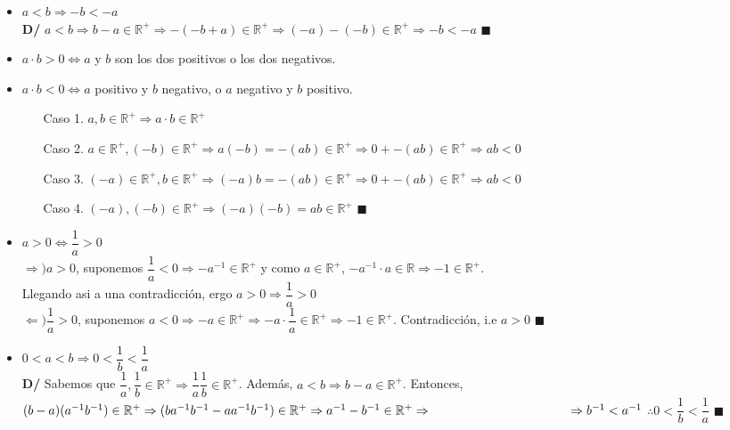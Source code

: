 \documentclass[11pt,a4paper]{article}
\newcommand*{\QEDA}{\null\nobreak\hfill\ensuremath{\blacksquare}}
\begin{document}
\begin{itemize}
\item $a < b \Rightarrow -b < -a$\\
\textbf{D/} $a < b \Rightarrow b - a \in \mathbb{R}^+ \Rightarrow - (-b + a) \in \mathbb{R}^+ \Rightarrow (-a) - (-b) \in \mathbb{R}^+ \Rightarrow -b < -a$ \QEDA
\item $a \cdot b > 0 \iff a$ y $b$ son los dos positivos o los dos negativos.
\item $a \cdot b < 0 \iff a$ positivo y $b$ negativo, o $a$ negativo y $b$ positivo.
\begin{enumerate}
\item [Caso 1. ] $a, b \in \mathbb{R}^+ \Rightarrow a \cdot b \in \mathbb{R}^+$
\item [Caso 2. ] $a \in \mathbb{R}^+, (-b) \in \mathbb{R}^+ \Rightarrow a(-b) = -(ab) \in \mathbb{R}^+ \Rightarrow 0 + -(ab) \in \mathbb{R}^+ \Rightarrow ab < 0$ 
\item [Caso 3. ] $(-a) \in \mathbb{R}^+, b \in \mathbb{R}^+ \Rightarrow (-a)b = -(ab) \in \mathbb{R}^+ \Rightarrow 0 + -(ab) \in \mathbb{R}^+ \Rightarrow ab < 0$ 
\item [Caso 4. ] $(-a),(-b) \in \mathbb{R}^+ \Rightarrow (-a)(-b) = ab \in \mathbb{R}^+$ \QEDA
\end{enumerate}
\item $a > 0 \iff \dfrac{1}{a} > 0$\\
$\Rightarrow) a > 0$, suponemos $\dfrac{1}{a} < 0 \Rightarrow -a^{-1} \in \mathbb{R}^+$ y como $a \in \mathbb{R}^+$, $-a^{-1} \cdot a \in \mathbb{R} \Rightarrow -1 \in \mathbb{R}^+$. \\ Llegando asi a una contradicci\'on, ergo $a > 0 \Rightarrow \dfrac{1}{a} > 0$\\
$\Leftarrow) \dfrac{1}{a} > 0$, suponemos $a < 0 \Rightarrow -a \in \mathbb{R}^+ \Rightarrow -a \cdot \dfrac{1}{a} \in \mathbb{R}^+ \Rightarrow -1 \in \mathbb{R}^+$. Contradicci\'on, i.e $a > 0$ \QEDA
\item $0 < a < b \Rightarrow 0 < \dfrac{1}{b} < \dfrac{1}{a}$\\
\textbf{D/} Sabemos que $\dfrac{1}{a}, \dfrac{1}{b} \in \mathbb{R}^+ \Rightarrow \dfrac{1}{a}\dfrac{1}{b} \in \mathbb{R}^+$. Adem\'as, $a < b \Rightarrow b - a \in \mathbb{R}^+$. Entonces, \\ $(b - a)(a^{-1}b^{-1}) \in \mathbb{R}^+ \Rightarrow (ba^{-1}b^{-1} - aa^{-1}b^{-1}) \in \mathbb{R}^+ \Rightarrow a^{-1}-b^{-1} \in \mathbb{R}^+ \Rightarrow \\ \indent \ \ \ \ \ \ \ \ \ \ \ \ \ \ \ \ \ \ \ \ \ \ \ \ \ \ \ \ \Rightarrow b^{-1} < a^{-1}$ $\therefore 0 < \dfrac{1}{b} < \dfrac{1}{a}$ \QEDA
\end{itemize}
\end{document}
